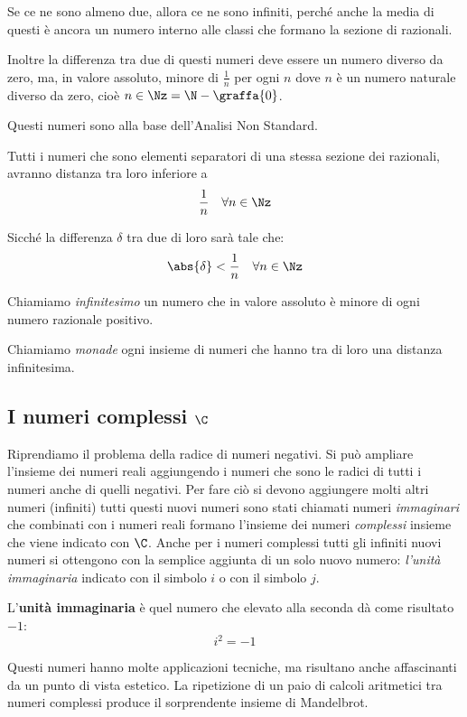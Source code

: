 Se ce ne sono almeno due, allora ce ne sono infiniti, perché anche la media 
di questi è ancora un numero interno alle classi che formano la sezione di 
razionali.

Inoltre la differenza tra due di questi numeri deve essere un numero diverso 
da zero, ma, in valore assoluto, minore di \(\frac{1}{n}\) per ogni \(n\) 
dove \(n\) è un numero naturale diverso da zero, cioè 
\(n \in \Nz = \N - \graffa{0}\). 

Questi numeri sono alla base dell'Analisi Non Standard.

Tutti i numeri che sono elementi separatori di una stessa sezione dei 
razionali, avranno distanza tra loro inferiore a 
\[\dfrac{1}{n} \quad \forall n \in \Nz\]

Sicché la differenza \(\delta\) tra due di loro sarà tale che: 
\[\abs{\delta} < \dfrac{1}{n} \quad \forall n \in \Nz\]

Chiamiamo \emph{infinitesimo} un numero che in valore assoluto è minore di 
ogni numero razionale positivo.

Chiamiamo \emph{monade} ogni insieme di numeri che hanno tra di loro una 
distanza infinitesima.

\subsection{I numeri complessi \(\C\)}
\label{subsec:insnum_complessi}

Riprendiamo il problema della radice di numeri negativi. Si può ampliare 
l'insieme dei numeri reali aggiungendo i numeri che sono le 
radici di tutti i numeri anche di quelli negativi. Per fare ciò si devono 
aggiungere molti altri numeri (infiniti) tutti questi nuovi numeri sono 
stati chiamati numeri \emph{immaginari} che combinati con i numeri reali 
formano l'insieme dei numeri \emph{complessi} insieme che viene indicato 
con 
\(\C\). 
Anche per i numeri complessi tutti gli infiniti nuovi numeri si ottengono 
con la semplice aggiunta di un solo nuovo numero: \emph{l'unità 
immaginaria} indicato con il simbolo \(i\) o con il simbolo \(j\).
\begin{definizione}
 L'\textbf{unità immaginaria} è quel numero che elevato alla seconda dà 
come risultato \(-1\):
\[i^2 = -1\]
\end{definizione}

Questi numeri hanno molte applicazioni tecniche, ma risultano anche 
affascinanti da un punto di vista estetico. La ripetizione di un paio di 
calcoli aritmetici tra numeri complessi produce il sorprendente insieme di 
Mandelbrot.

